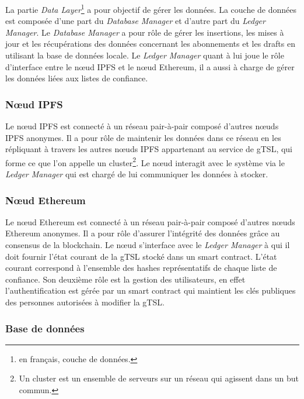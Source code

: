 \documentclass{tnreport}
\begin{document}
La partie \textit{Data Layer}\footnote{en français, couche de données.} a pour objectif de gérer les données. La couche de données est composée d'une part du \textit{Database Manager} et d'autre part du \textit{Ledger Manager}. Le \textit{Database Manager} a pour rôle de gérer les insertions, les mises à jour et les récupérations des données concernant les abonnements et les drafts en utilisant la base de données locale. Le \textit{Ledger Manager} quant à lui joue le rôle d'interface entre le nœud IPFS et le nœud Ethereum, il a aussi à charge de gérer les données liées aux listes de confiance.

\subsubsection{Nœud IPFS}

Le nœud IPFS est connecté à un réseau pair-à-pair composé d'autres nœuds IPFS anonymes. Il a pour rôle de maintenir les données dans ce réseau en les répliquant à travers les autres nœuds IPFS appartenant au service de gTSL, qui forme ce que l'on appelle un cluster\footnote{Un cluster est un ensemble de serveurs sur un réseau qui agissent dans un but commun.}. Le nœud interagit avec le système via le \textit{Ledger Manager} qui est chargé de lui communiquer les données à stocker.

\subsubsection{Nœud Ethereum}

Le nœud Ethereum est connecté à un réseau pair-à-pair composé d'autres nœuds Ethereum anonymes. Il a pour rôle d'assurer l'intégrité des données grâce au consensus de la blockchain. Le nœud s'interface avec le \textit{Ledger Manager} à qui il doit fournir l'état courant de la gTSL stocké dans un smart contract. L'état courant correspond à l'ensemble des hashes représentatifs de chaque liste de confiance. Son deuxième rôle est la gestion des utilisateurs, en effet l'authentification est gérée par un smart contract qui maintient les clés publiques des personnes autorisées à modifier la gTSL.

\subsubsection{Base de données}
\end{document}
